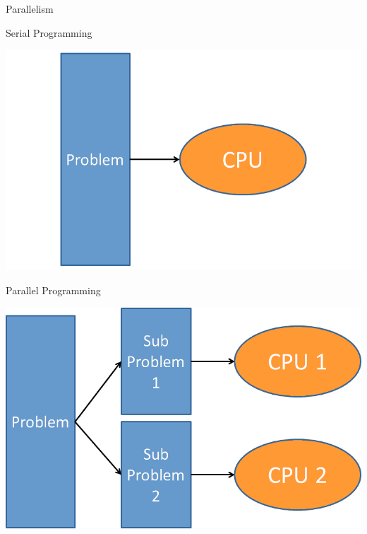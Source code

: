 \begin{frame}
  \begin{block}{Parallelism}\pause
    \begin{center}
    \begin{minipage}{.46\textwidth}
    \begin{block}{\centering Serial Programming}
      \begin{center}
      \includegraphics[width=.975\textwidth]{../common/pics/parallelism1}
      \end{center}
      \end{block}
    \end{minipage}
    \hspace{.15cm}
    \begin{minipage}{.46\textwidth}
    \begin{block}{\centering Parallel Programming}
      \begin{center}
      \includegraphics[width=.975\textwidth]{../common/pics/parallelism2}
      \end{center}
      \end{block}
    \end{minipage}
    \end{center}
  \end{block}
\end{frame}

